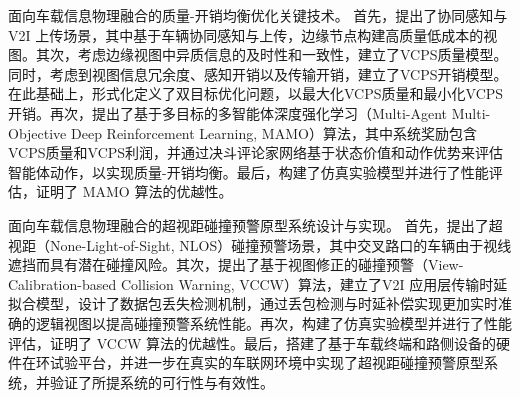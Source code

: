 \begin{cabstract}
 面向车载信息物理融合的质量-开销均衡优化关键技术。
首先，提出了协同感知与 V2I 上传场景，其中基于车辆协同感知与上传，边缘节点构建高质量低成本的视图。其次，考虑边缘视图中异质信息的及时性和一致性，建立了VCPS质量模型。同时，考虑到视图信息冗余度、感知开销以及传输开销，建立了VCPS开销模型。在此基础上，形式化定义了双目标优化问题，以最大化VCPS质量和最小化VCPS开销。再次，提出了基于多目标的多智能体深度强化学习（Multi-Agent Multi-Objective Deep Reinforcement Learning, MAMO）算法，其中系统奖励包含VCPS质量和VCPS利润，并通过决斗评论家网络基于状态价值和动作优势来评估智能体动作，以实现质量-开销均衡。最后，构建了仿真实验模型并进行了性能评估，证明了 MAMO 算法的优越性。

 面向车载信息物理融合的超视距碰撞预警原型系统设计与实现。
首先，提出了超视距（None-Light-of-Sight, NLOS）碰撞预警场景，其中交叉路口的车辆由于视线遮挡而具有潜在碰撞风险。其次，提出了基于视图修正的碰撞预警（View-Calibration-based Collision Warning, VCCW）算法，建立了V2I 应用层传输时延拟合模型，设计了数据包丢失检测机制，通过丢包检测与时延补偿实现更加实时准确的逻辑视图以提高碰撞预警系统性能。再次，构建了仿真实验模型并进行了性能评估，证明了 VCCW 算法的优越性。最后，搭建了基于车载终端和路侧设备的硬件在环试验平台，并进一步在真实的车联网环境中实现了超视距碰撞预警原型系统，并验证了所提系统的可行性与有效性。

\end{cabstract}

